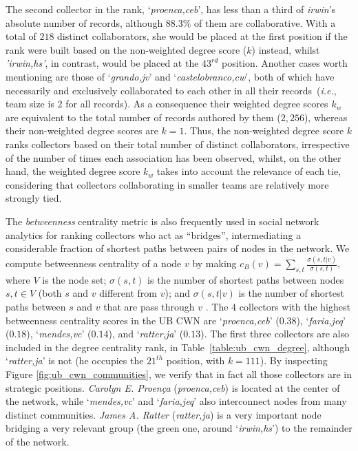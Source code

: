 %
The second collector in the rank, `\textit{proenca,ceb}', has less than a third of \textit{irwin}'s absolute number of records, although $88.3\%$ of them are collaborative. 
With a total of $218$ distinct collaborators, she would be placed at the first position if the rank were built based on the non-weighted degree score ($k$) instead, whilst \textit{'irwin,hs'}, in contrast, would be placed at the $43^{rd}$ position.
%
Another cases worth mentioning are those of `\textit{grando,jv}' and `\textit{castelobranco,cw}', both of which have necessarily and exclusively collaborated to each other in all their records~(\textit{i.e.}, team size is $2$ for all records).
As a consequence their weighted degree scores $k_w$ are equivalent to the total number of records authored by them ($2,256$), whereas their non-weighted degree scores are $k=1$.
%
Thus, the non-weighted degree score $k$ ranks collectors based on their total number of distinct collaborators, irrespective of the  number of times each association has been observed, whilst, on the other hand, the weighted degree score $k_w$ takes into account the relevance of each tie, considering that collectors collaborating in smaller teams are relatively more strongly tied.

The \textit{betweenness} centrality metric is also frequently used in social network analytics for ranking collectors who act as ``bridges'', intermediating a considerable fraction of shortest paths between pairs of nodes in the network. 
We compute betweenness centrality of a node $v$ by making $c_B(v) =\sum_{s,t} \frac{\sigma(s, t|v)}{\sigma(s, t)}$, where $V$ is the node set; $\sigma(s,t)$ is the number of shortest paths between nodes $s, t \in V$ (both $s$ and $v$ different from $v$); and $\sigma(s,t|v)$ is the number of shortest paths between $s$ and $v$ that are pass through $v$ \cite{Brandes2008}. 
The $4$ collectors with the highest betweenness centrality scores in the UB CWN are `\textit{proenca,ceb}' ($0.38$), `\textit{faria,jeq}' ($0.18$), `\textit{mendes,vc}' ($0.14$), and `\textit{ratter,ja}' ($0.13$).
The first three collectors are also included in the degree centrality rank, in Table~\ref{table:ub_cwn_degree}, although `\textit{ratter,ja}' is not (he occupies the $21^{th}$ position, with $k=111$).
By inspecting Figure \ref{fig:ub_cwn_communities}, we verify that in fact all those collectors are in strategic positions.
\textit{Carolyn E. Proença} (\textit{proenca,ceb}) is located at the center of the network, while `\textit{mendes,vc}' and `\textit{faria,jeq}' also interconnect nodes from many distinct communities.
\textit{James A. Ratter} (\textit{ratter,ja}) is a very important node bridging a very relevant group (the green one, around `\textit{irwin,hs}') to the remainder of the network.

